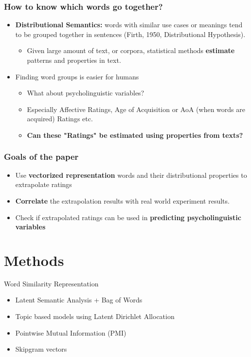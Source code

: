 \documentclass{beamer}
\begin{document}

\begin{frame}
\frametitle{How to know which words go together?}
\begin{itemize}
\item \textbf{Distributional Semantics:} words with similar use cases or meanings tend to be grouped together in sentences (Firth, 1950, Distributional Hypothesis).
    \begin{itemize}
        \item Given large amount of text, or corpora, statistical methods \textbf{estimate} patterns and properties in text.
    \end{itemize}
\item Finding word groups is easier for humans
    \begin{itemize}
        \item What about psycholinguistic variables? 
        \item Especially Affective Ratings, Age of Acquisition or AoA (when words are acquired) Ratings etc.
        \item \textbf{Can these "Ratings" be estimated using properties from texts?}
    \end{itemize}
\end{itemize}
\end{frame}

\begin{frame}
\frametitle{Goals of the paper}
\begin{itemize}
\item Use \textbf{vectorized representation} words and their distributional properties to extrapolate ratings
\item \textbf{Correlate} the extrapolation results with real world experiment results.
\item Check if extrapolated ratings can be used in \textbf{predicting psycholinguistic variables}
\end{itemize}
\end{frame}


\section{Methods}
\begin{frame}{Word Similarity Representation}
    \begin{itemize}
        \item Latent Semantic Analysis + Bag of Words
        \item Topic based models using Latent Dirichlet Allocation
        \item Pointwise Mutual Information (PMI)
        \item Skipgram vectors
    \end{itemize}
\end{frame}
\end{document}
